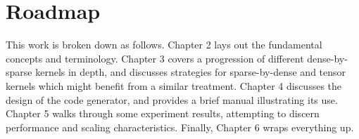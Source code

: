\section{Roadmap} 
  This work is broken down as follows. Chapter 2 lays out the fundamental concepts and terminology. Chapter 3 covers a progression of different dense-by-sparse kernels in depth, and discusses strategies for sparse-by-dense and tensor kernels which might benefit from a similar treatment. Chapter 4 discusses the design of the code generator, and provides a brief manual illustrating its use. Chapter 5 walks through some experiment results, attempting to discern performance and scaling characteristics. Finally, Chapter 6 wraps everything up.










